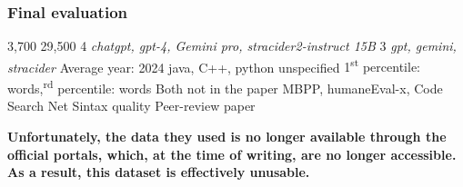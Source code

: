 \subsubsection*{Final evaluation}






\expandafter\def\csname SuhHumanCode\endcsname{3,700}
\expandafter\def\csname SuhLLMCode\endcsname{29,500}
\expandafter\def\csname SuhNumLLMs\endcsname{4 \textit{chatgpt, gpt-4, Gemini pro, stracider2-instruct 15B}}
\expandafter\def\csname SuhLLMDiversity\endcsname{3 \textit{gpt, gemini, stracider}}
\expandafter\def\csname SuhCurrentUse\endcsname{Average year: 2024}
\expandafter\def\csname SuhLanguages\endcsname{java, C++, python}
\expandafter\def\csname SuhCodeTypes\endcsname{unspecified}
\expandafter\def\csname SuhCodeSize\endcsname{1\textsuperscript{st} percentile:  words,\textsuperscript{rd} percentile:  words}
\expandafter\def\csname SuhCodeContext\endcsname{Both}
\expandafter\def\csname SuhPrompts\endcsname{not in the paper}
\expandafter\def\csname SuhSources\endcsname{MBPP, humaneEval-x, Code Search Net}
\expandafter\def\csname SuhCodeQuality\endcsname{Sintax quality}
\expandafter\def\csname SuhReliability\endcsname{Peer-review paper}



\textbf{Unfortunately, the data they used is no longer available 
through the official portals, which, at the time of writing, 
are no longer accessible. As a result, this dataset is 
effectively unusable.}
